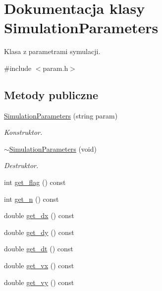 \hypertarget{class_simulation_parameters}{}\section{Dokumentacja klasy Simulation\+Parameters}
\label{class_simulation_parameters}


Klasa z parametrami symulacji.  




{\ttfamily \#include $<$param.\+h$>$}

\subsection*{Metody publiczne}
\begin{DoxyCompactItemize}
\item 
\hyperlink{class_simulation_parameters_a8b4b79aaaca9c17cf79f19871f7bc432}{Simulation\+Parameters} (string param)
\begin{DoxyCompactList}\small\item\em Konstruktor. \end{DoxyCompactList}\item 
\hyperlink{class_simulation_parameters_ae2858173523e3d44efdb5e7cb1c41785}{$\sim$\+Simulation\+Parameters} (void)
\begin{DoxyCompactList}\small\item\em Destruktor. \end{DoxyCompactList}\item 
int \hyperlink{class_simulation_parameters_a68fcda888ff9c17f3d8cc548ecb2a971}{get\+\_\+flag} () const 
\item 
int \hyperlink{class_simulation_parameters_a9966bac3c9484aeed65d4aa4a7c31c17}{get\+\_\+n} () const 
\item 
double \hyperlink{class_simulation_parameters_a17ece2a3b38e27abe7902345debcc292}{get\+\_\+dx} () const 
\item 
double \hyperlink{class_simulation_parameters_ab86fb4ed8f1f9fe460e860e1973cba03}{get\+\_\+dy} () const 
\item 
double \hyperlink{class_simulation_parameters_ad939af4a1bd01ab8d28ae089d3443695}{get\+\_\+dt} () const 
\item 
double \hyperlink{class_simulation_parameters_a4d5e46cf9fedbbf3f54730dfd3ae8e48}{get\+\_\+vx} () const 
\item 
double \hyperlink{class_simulation_parameters_afafb8a1cd0b36e1a44634ef12f63a131}{get\+\_\+vy} () const 
\item 

\end{DoxyCompactItemize}
